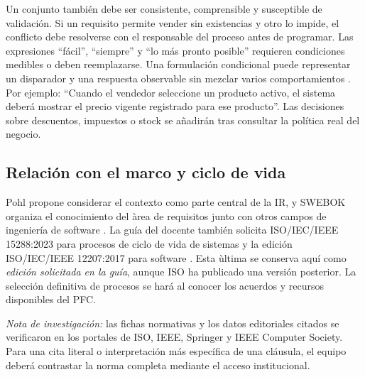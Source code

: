 Un conjunto tambi\'en debe ser consistente, comprensible y susceptible de validaci\'on. Si un requisito permite vender sin existencias y otro lo impide, el conflicto debe resolverse con el responsable del proceso antes de programar. Las expresiones ``f\'acil'', ``siempre'' y ``lo m\'as pronto posible'' requieren condiciones medibles o deben reemplazarse. Una formulación condicional puede representar un disparador y una respuesta observable sin mezclar varios comportamientos \cite{montgomery2022}. Por ejemplo: ``Cuando el vendedor seleccione un producto activo, el sistema deber\'a mostrar el precio vigente registrado para ese producto''. Las decisiones sobre descuentos, impuestos o stock se a\~nadir\'an tras consultar la pol\'itica real del negocio.

\subsection{Relaci\'on con el marco y ciclo de vida}
Pohl propone considerar el contexto como parte central de la IR, y SWEBOK organiza el conocimiento del \`area de requisitos junto con otros campos de ingenier\'ia de software \cite{pohl2025,swebok2024}. La gu\'ia del docente tambi\'en solicita ISO/IEC/IEEE 15288:2023 para procesos de ciclo de vida de sistemas y la edici\'on ISO/IEC/IEEE 12207:2017 para software \cite{iso15288,iso12207}. Esta \`ultima se conserva aqu\'i como \emph{edici\'on solicitada en la gu\'ia}, aunque ISO ha publicado una versi\'on posterior. La selecci\'on definitiva de procesos se har\'a al conocer los acuerdos y recursos disponibles del PFC.

\noindent\textit{Nota de investigaci\'on:} las fichas normativas y los datos editoriales citados se verificaron en los portales de ISO, IEEE, Springer y IEEE Computer Society. Para una cita literal o interpretaci\'on m\'as espec\'ifica de una cl\'ausula, el equipo deber\'a contrastar la norma completa mediante el acceso institucional.
